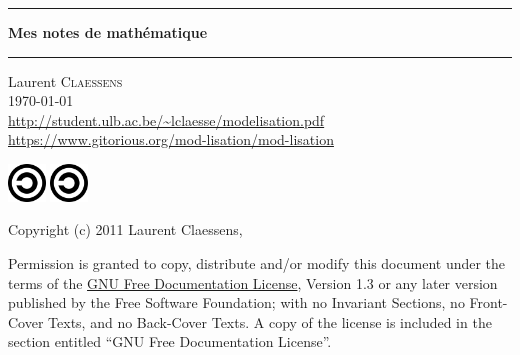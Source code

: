 \thispagestyle{empty}
\begin{center}
  \begin{minipage}{15cm}
    \hrule\par
    \vspace{2mm}
    \begin{center}
    \Huge \bfseries Mes notes de mathématique \par
    \end{center}
    \hrule\par
  \end{minipage}
\end{center}

\vspace{2cm}

\begin{center}
    Laurent \textsc{Claessens}\\
    \today\\
    \url{http://student.ulb.ac.be/~lclaesse/modelisation.pdf}\\
    \url{https://www.gitorious.org/mod-lisation/mod-lisation}
\end{center}

\vfill

\begin{center}

           \ifpdf
            \includegraphics[width=1cm]{Copyleft.svg}
        \else
            \includegraphics[width=1cm]{Copyleft.eps}
        \fi



Copyright (c) 2011  Laurent Claessens,

Permission is granted to copy, distribute and/or modify this document under the terms of the \href{http://www.gnu.org/licenses/fdl-1.3.html}{GNU Free Documentation License}, Version 1.3 or any later version published by the Free Software Foundation; with no Invariant Sections, no Front-Cover Texts, and no Back-Cover Texts. A copy of the license is included in the section entitled ``GNU Free Documentation License''.


\end{center}

\clearpage

